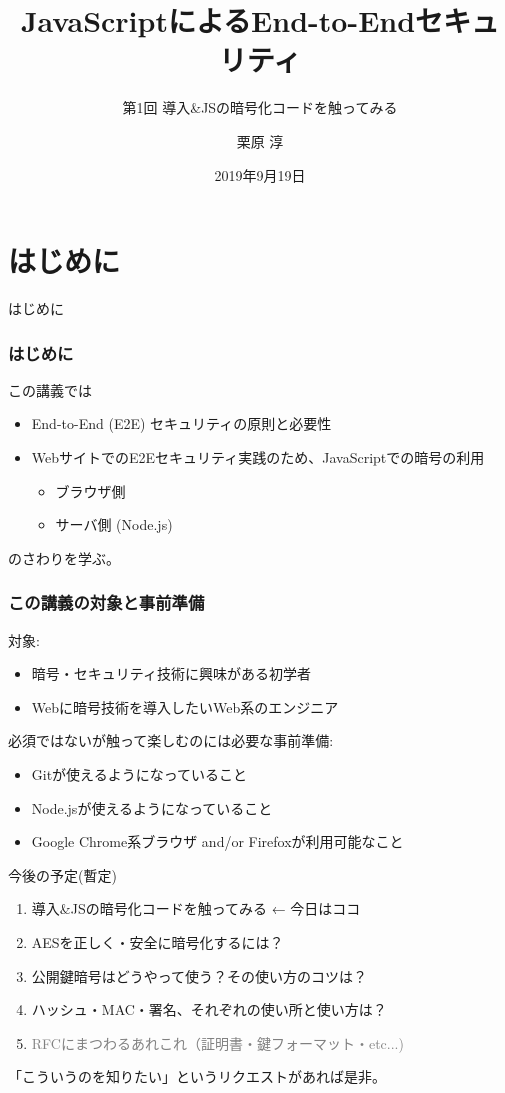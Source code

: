 \documentclass[12pt,dvipdfmx]{beamer}
\title[E2E Security with JS 01]{JavaScriptによるEnd-to-Endセキュリティ}
\subtitle{第1回 導入\&JSの暗号化コードを触ってみる}
\author[Jun Kurihara]{栗原 淳}
\institute[]{}
\date[Sept. 19, 2019]{2019年9月19日}
\begin{document}
\begin{frame}
\titlepage
\end{frame}

\section{はじめに}

\begin{frame}
 \centering
 {\Large はじめに}
\end{frame}

\begin{frame}
\frametitle{はじめに}
この講義では
\begin{itemize}
 \item End-to-End (E2E) セキュリティの原則と必要性
 \item WebサイトでのE2Eセキュリティ実践のため、JavaScriptでの暗号の利用
\begin{itemize}
 \item ブラウザ側
 \item サーバ側 (Node.js)
\end{itemize}
\end{itemize}
のさわりを学ぶ。
\end{frame}




\begin{frame}
\frametitle{この講義の対象と事前準備}
対象:
\begin{itemize}
\item 暗号・セキュリティ技術に興味がある初学者
\item Webに暗号技術を導入したいWeb系のエンジニア
\end{itemize}

\vspace{2ex}

必須ではないが触って楽しむのには必要な事前準備:
\begin{itemize}
\item Gitが使えるようになっていること
\item Node.jsが使えるようになっていること
\item Google Chrome系ブラウザ and/or Firefoxが利用可能なこと
\end{itemize}
\end{frame}

\begin{frame}
今後の予定(暫定)
\begin{enumerate}
 \item \alert{導入\&JSの暗号化コードを触ってみる} ← 今日はココ
 \item AESを正しく・安全に暗号化するには？
 \item 公開鍵暗号はどうやって使う？その使い方のコツは？
 \item ハッシュ・MAC・署名、それぞれの使い所と使い方は？
 \item \textcolor{gray}{RFCにまつわるあれこれ（証明書・鍵フォーマット・etc...)}
\end{enumerate}
「こういうのを知りたい」というリクエストがあれば是非。
\end{frame}
\end{document}
